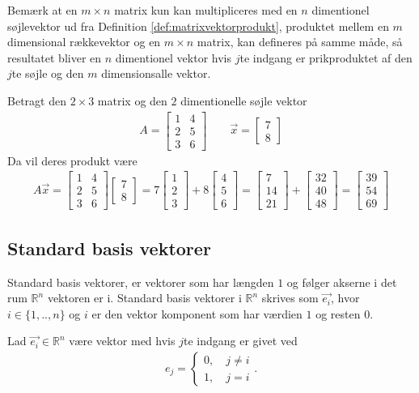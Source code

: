 Bemærk at en $m \times n$ matrix kun kan multipliceres med en $n$ dimentionel søjlevektor ud fra Definition \ref{def:matrixvektorprodukt}, produktet mellem en $m$ dimensional rækkevektor og en $m \times n$ matrix, kan defineres på samme måde, så resultatet bliver en $n$ dimentionel vektor hvis $j$te indgang er prikproduktet af den $j$te søjle og den $m$ dimensionsalle vektor. 
\begin{eks}
Betragt den $2 \times 3$ matrix og den $2$ dimentionelle søjle vektor
\begin{align*}
A=
\begin{bmatrix}
1 & 4\\
2 & 5\\
3 & 6
\end{bmatrix}
\qquad
\vec{x}=
\begin{bmatrix}
7\\
8
\end{bmatrix}
\end{align*}
Da vil deres produkt være
\begin{align*}
A\vec{x}= \begin{bmatrix}
1 & 4\\
2 & 5\\
3 & 6
\end{bmatrix}
\begin{bmatrix}
7\\
8
\end{bmatrix}
=
7
\begin{bmatrix}
1\\
2\\
3
\end{bmatrix}
+ 8
\begin{bmatrix}
4\\
5\\
6
\end{bmatrix}=
\begin{bmatrix}
7\\
14\\
21
\end{bmatrix}
+
\begin{bmatrix}
32\\
40\\
48
\end{bmatrix}
=
\begin{bmatrix}
39\\
54\\
69
\end{bmatrix}
\end{align*}
\end{eks}
\subsection{Standard basis vektorer}
Standard basis vektorer, er vektorer som har længden $1$ og følger akserne i det rum $\mathds{R}^n$ vektoren er i.
Standard basis vektorer i $\mathds{R}^n$ skrives som $\vec{e_i}$, hvor $i\in \{1,..,n\}$ og $i$ er den vektor komponent som har værdien $1$ og resten $0$.

\begin{defn}
Lad $\vec{e_i}\in\mathds{R}^n$ være vektor med hvis $j$te indgang er givet ved
\begin{align*}
e_j=\begin{cases} 0, \quad j \neq i
\\ 1 , \quad j = i \end{cases}.
\end{align*}

\end{defn}